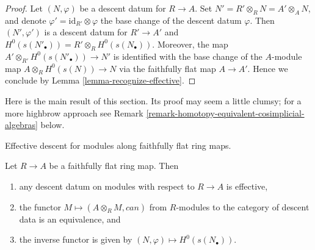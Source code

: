 \begin{proof}
Let $(N, \varphi)$ be a descent datum for $R \to A$.
Set $N' = R' \otimes_R N = A' \otimes_A N$, and denote
$\varphi' = \text{id}_{R'} \otimes \varphi$ the base change
of the descent datum $\varphi$. Then $(N', \varphi')$ is
a descent datum for $R' \to A'$ and
$H^0(s(N'_\bullet)) = R' \otimes_R H^0(s(N_\bullet))$.
Moreover, the map
$A' \otimes_{R'} H^0(s(N'_\bullet)) \to N'$ is identified
with the base change of the $A$-module map
$A \otimes_R H^0(s(N)) \to N$ via the faithfully flat map
$A \to A'$. Hence we conclude by Lemma \ref{lemma-recognize-effective}.
\end{proof}

\noindent
Here is the main result of this section.
Its proof may seem a little clumsy; for a more highbrow approach see
Remark \ref{remark-homotopy-equivalent-cosimplicial-algebras} below.

\begin{proposition}
\label{proposition-descent-module}
\begin{slogan}
Effective descent for modules along faithfully flat ring maps.
\end{slogan}
Let $R \to A$ be a faithfully flat ring map.
Then
\begin{enumerate}
\item any descent datum on modules with respect to $R \to A$
is effective,
\item the functor $M \mapsto (A \otimes_R M, can)$ from $R$-modules
to the category of descent data is an equivalence, and
\item the inverse functor is given by $(N, \varphi) \mapsto H^0(s(N_\bullet))$.
\end{enumerate}
\end{proposition}


